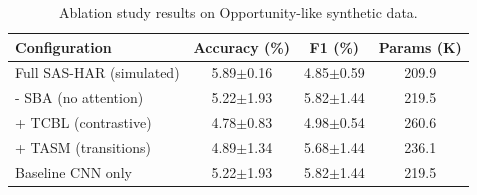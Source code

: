 \begin{table}[htbp]
\centering
\caption{Ablation study results on Opportunity-like synthetic data.}
\label{tab:ablation}
\begin{tabular}{lccc}
\toprule
\textbf{Configuration} & \textbf{Accuracy (\%)} & \textbf{F1 (\%)} & \textbf{Params (K)} \\
\midrule
Full SAS-HAR (simulated) & 5.89$\pm$0.16 & 4.85$\pm$0.59 & 209.9 \\
- SBA (no attention) & 5.22$\pm$1.93 & 5.82$\pm$1.44 & 219.5 \\
+ TCBL (contrastive) & 4.78$\pm$0.83 & 4.98$\pm$0.54 & 260.6 \\
+ TASM (transitions) & 4.89$\pm$1.34 & 5.68$\pm$1.44 & 236.1 \\
Baseline CNN only & 5.22$\pm$1.93 & 5.82$\pm$1.44 & 219.5 \\
\bottomrule
\end{tabular}
\end{table}
